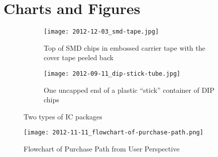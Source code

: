 \documentclass[12pt,oneside,final]{article}
\begin{document}
\section{Charts and Figures}

\begin{figure}[H]%
  \centering%
  \begin{subfigure}{0.45\textwidth}%
    \centering%
    \texttt{[image: 2012-12-03\_smd-tape.jpg]}%
    \caption{Top of SMD chips in embossed carrier tape with the cover tape peeled back}%
  \end{subfigure}%
  \hspace{0.1\textwidth}%
  \begin{subfigure}{0.45\textwidth}%
    \centering%
    \texttt{[image: 2012-09-11\_dip-stick-tube.jpg]}%
    \caption{One uncapped end of a plastic ``stick'' container of DIP chips}%
  \end{subfigure}%
  \caption{Two types of IC packages}%
  \label{fig:packages}%
\end{figure}

\begin{figure}[H]%
  \texttt{[image: 2012-11-11\_flowchart-of-purchase-path.png]}%
  \caption{Flowchart of Purchase Path from User Perspective}%
  \label{fig:purchase-path}%
\end{figure}
\end{document}
